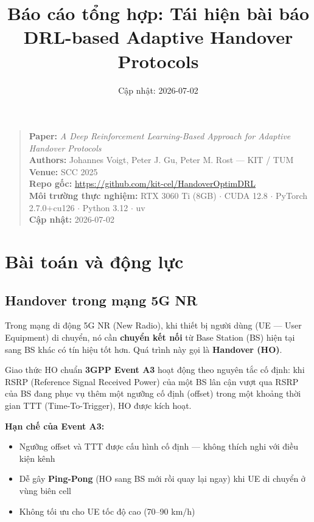 \documentclass[11pt]{article}
\title{\textbf{Báo cáo tổng hợp: Tái hiện bài báo\\DRL-based Adaptive Handover Protocols}}
\author{}
\date{Cập nhật: 2026-07-02}
\begin{document}
\maketitle

\begin{quote}
\textbf{Paper:} \textit{A Deep Reinforcement Learning-Based Approach for Adaptive Handover Protocols}\\
\textbf{Authors:} Johannes Voigt, Peter J. Gu, Peter M. Rost --- KIT / TUM\\
\textbf{Venue:} SCC 2025\\
\textbf{Repo gốc:} \url{https://github.com/kit-cel/HandoverOptimDRL}\\
\textbf{Môi trường thực nghiệm:} RTX 3060 Ti (8GB) $\cdot$ CUDA 12.8 $\cdot$ PyTorch 2.7.0+cu126 $\cdot$ Python 3.12 $\cdot$ uv\\
\textbf{Cập nhật:} 2026-07-02
\end{quote}

\tableofcontents
\newpage

\section{Bài toán và động lực}

\subsection{Handover trong mạng 5G NR}

Trong mạng di động 5G NR (New Radio), khi thiết bị người dùng (UE --- User Equipment) di chuyển, nó cần \textbf{chuyển kết nối} từ Base Station (BS) hiện tại sang BS khác có tín hiệu tốt hơn. Quá trình này gọi là \textbf{Handover (HO)}.

Giao thức HO chuẩn \textbf{3GPP Event A3} hoạt động theo nguyên tắc cố định: khi RSRP (Reference Signal Received Power) của một BS lân cận vượt qua RSRP của BS đang phục vụ thêm một ngưỡng cố định (offset) trong một khoảng thời gian TTT (Time-To-Trigger), HO được kích hoạt.

\textbf{Hạn chế của Event A3:}
\begin{itemize}
  \item Ngưỡng offset và TTT được cấu hình cố định --- không thích nghi với điều kiện kênh
  \item Dễ gây \textbf{Ping-Pong} (HO sang BS mới rồi quay lại ngay) khi UE di chuyển ở vùng biên cell
  \item Không tối ưu cho UE tốc độ cao (70--90 km/h)
\end{itemize}
\end{document}
